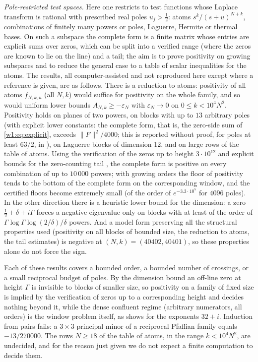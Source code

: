 \documentclass[11pt]{amsart}
\theoremstyle{definition}
\theoremstyle{remark}
\numberwithin{equation}{section}
\begin{document}
\label{w5:subsec:power}%
\emph{Pole-restricted test spaces.} Here one restricts to test functions whose Laplace transform is rational with
prescribed real poles $u_j>\frac12$: atoms $s^k/(s+u)^{N+k}$, combinations of finitely many powers or poles, Laguerre,
Hermite or thermal bases. On such a subspace the complete form is a finite matrix whose entries are explicit sums over
zeros, which can be split into a verified range (where the zeros are known to lie on the line) and a tail; the aim is to
prove positivity on growing subspaces and to reduce the general case to a table of scalar inequalities for the atoms.
The results, all computer-assisted and not reproduced here except where a reference is given, are as follows. There is a
reduction to atoms: positivity of all atoms $f_{N,k,u}$ (all $N,k$) would suffice for positivity on the whole family, and
so would uniform lower bounds $A_{N,k}\ge-\varepsilon_N$ with $\varepsilon_N\to0$ on $0\le k<10^4N^2$. Positivity holds on
planes of two powers, on blocks with up to $13$ arbitrary poles (with explicit lower constants: the complete form, that
is, the zero-side sum of \eqref{w1:eq:explicit}, exceeds $\|F\|^2/4000$; this is reported without proof, for poles
at least $63/2$, in \cite[Section~11]{P46}), on
Laguerre blocks of dimension $12$, and on large rows of the table of atoms. Using the verification of the zeros up to
height $3\cdot10^{12}$ \cite{PlattTrudgian2021} and explicit bounds for the zero-counting tail \cite{Trudgian2014}, the
complete form is positive on every combination of up to $10\,000$ powers; with growing orders the floor of positivity
tends to the bottom of the complete form on the corresponding window, and the certified floors become extremely small
(of the order of $e^{-3.3\cdot10^5}$ for $4096$ poles). In the other direction there is a heuristic lower bound for
the dimension: a zero $\frac12+\delta+i\Gamma$ forces a negative eigenvalue only on blocks with at least of the order of
$\Gamma\log\Gamma\log(2/\delta)/\delta$ powers. And a model form preserving all the structural properties used
(positivity on all blocks of bounded size, the reduction to atoms, the tail estimates) is negative at
$(N,k)=(40402,40401)$, so these properties alone do not force the sign.

Each of these results covers a bounded order, a bounded number of crossings, or a small reciprocal budget of poles.
By the dimension bound an off-line zero at height $\Gamma$ is invisible to blocks of smaller size, so positivity on a
family of fixed size is implied by the verification of zeros up to a corresponding height and decides nothing beyond
it, while the dense confluent regime (arbitrary numerators, all orders) is the window problem itself, as
\cite[Proposition~11.1]{P46} shows for the exponents $32+i$. Induction from pairs fails: a $3\times3$ principal minor
of a reciprocal Pfaffian family equals $-13/270000$. The rows $N\ge18$ of the table of atoms, in the range
$k<10^4N^2$, are undecided, and for the reason just given we do not expect a finite computation to decide them.
\end{document}
